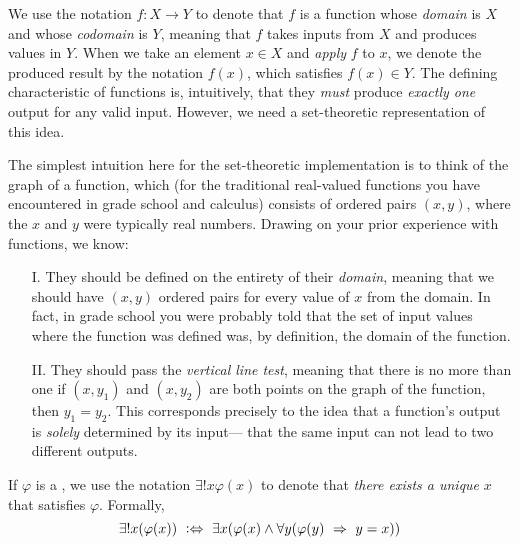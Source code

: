 \begin{intuition}[Function]
    We use the notation $f: X \to Y$ to denote that $f$ is a function
    whose \emph{domain} is $X$ and whose \emph{codomain} is $Y$,
    meaning that $f$ takes inputs from $X$ and produces values in $Y$.
    When we take an element $x \in X$ and \emph{apply} $f$ to $x$,
    we denote the produced result by the notation $f(x)$, which satisfies $f(x) \in Y$.
    The defining characteristic of functions is, intuitively,
    that they \emph{must} produce \emph{exactly one} output for any valid input.
    However, we need a set-theoretic representation of this idea.

    The simplest intuition here for the set-theoretic implementation is to think of the graph of a function,
    which (for the traditional real-valued functions you have encountered in grade school and calculus)
    consists of ordered pairs $(x, y)$, where the $x$ and $y$ were typically real numbers.
    Drawing on your prior experience with functions, we know:
    \begin{enumerate}
        \item[I.]
            They should be defined on the entirety of their \emph{domain},
            meaning that we should have $(x, y)$ ordered pairs for every value of $x$ from the domain.
            In fact, in grade school you were probably told that the set of input values
            where the function was defined was, by definition, the domain of the function.
        \item[II.]
            They should pass the \emph{vertical line test},
            meaning that there is no more than one if $(x, y_1)$ and $(x, y_2)$ are both points
            on the graph of the function, then $y_1 = y_2$.
            This corresponds precisely to the idea that
            a function's output is \emph{solely} determined by its input---%
            that the same input can not lead to two different outputs.
    \end{enumerate}
\end{intuition}

\begin{definition}
    If $\varphi$ is a {\wff}, we use the notation $\exists! x \varphi(x)$ to denote that
    \emph{there exists a unique} $x$ that satisfies $\varphi$.
    Formally,
    \[
        \exists! x \pn*{\varphi(x)} \iffdefn \exists x \pn*{\varphi(x) \meet \forall y \pn*{\varphi(y) \implies y = x}}
    \]
\end{definition}

